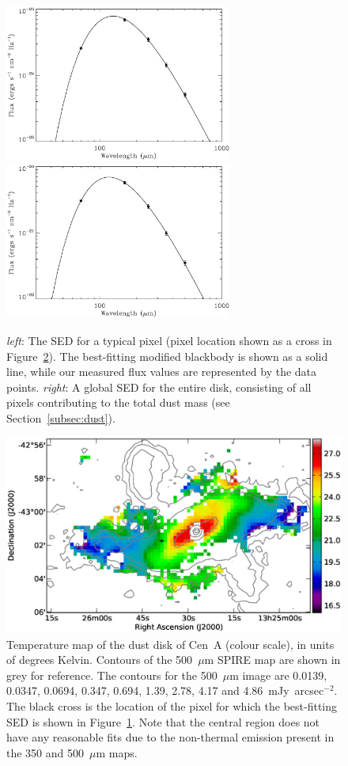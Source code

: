 \documentclass[useAMS,usenatbib,usegraphicx]{mn2e}
\begin{document}
\begin{figure}
 \includegraphics[width=7.5cm]{Fig3a_CenA_example_SED}
 \includegraphics[width=7.5cm]{Fig3b_CenA_global_sed}
\caption{\textit{left}: The SED for a typical pixel (pixel location shown as a cross in Figure~\ref{fig:temp}).  The best-fitting modified blackbody is shown as a solid line, while our measured flux values are represented by the data points. \textit{right}: A global SED for the entire disk, consisting of all pixels contributing to the total dust mass (see Section~\ref{subsec:dust}).}
\label{fig:sed}
\end{figure}

\begin{figure}
\includegraphics[width=15cm]{Fig4_CenA_temp_map}
\caption{Temperature map of the dust disk of Cen~A (colour scale), in units of degrees Kelvin.  Contours of the 500~$\mu$m SPIRE map are shown in grey for reference.  The contours for the 500~$\mu$m image are 0.0139, 0.0347, 0.0694, 0.347, 0.694, 1.39, 2.78, 4.17 and 4.86~mJy~arcsec$^{-2}$.  The black cross is the location of the pixel for which the best-fitting SED is shown in Figure~\ref{fig:sed}. Note that the central region does not have any reasonable fits due to the non-thermal emission present in the 350 and 500~$\mu$m maps.}
\label{fig:temp}
\end{figure}
\end{document}
